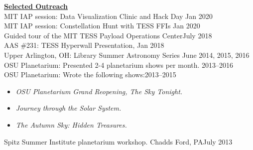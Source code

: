 \documentclass[letterpaper,11pt]{article}
\begin{document}
\noindent\underline{\textbf{Selected Outreach}}\\
MIT IAP session:  Data Visualization Clinic and Hack Day \hfill Jan 2020\\
MIT IAP session:  Constellation Hunt with TESS FFIs \hfill Jan 2020\\
Guided tour of the MIT TESS Payload Operations Center\hfill July 2018\\
AAS \#231:  TESS Hyperwall Presentation,  \hfill Jan 2018\\
Upper Arlington, OH:   Library Summer Astronomy Series \hfill June 2014, 2015, 2016\\
OSU Planetarium:  Presented 2-4 planetarium shows per month. \hfill 2013--2016\\
OSU Planetarium: Wrote the following shows:\hfill2013--2015
\begin{itemize}[nosep,label=\textbullet]
\item \textit{OSU Planetarium Grand Reopening, The Sky Tonight.}
\item \textit{Journey through the Solar System.}
\item \textit{The Autumn Sky:  Hidden Treasures.}
\end{itemize}
Spitz Summer Institute planetarium workshop. Chadds Ford, PA\hfill July 2013\\



\end{document}
